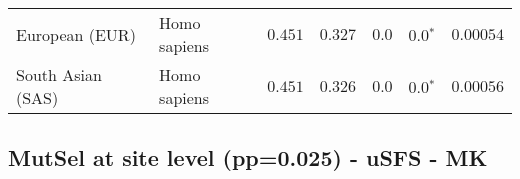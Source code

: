 \begin{center}
\begin{adjustbox}{width = 1\textwidth}
\begin{tabular}{|l|l|r|r|r|r|r|}
                 European (EUR) &         Homo sapiens &                                           $ 0.451$ &                                           $ 0.327$ &            $0.0$ &                  $\bm{0.0{^*}}$ &          $0.00054$ \\
              South Asian (SAS) &         Homo sapiens &                                           $ 0.451$ &                                           $ 0.326$ &            $0.0$ &                  $\bm{0.0{^*}}$ &          $0.00056$ \\
\bottomrule
\end{tabular}
\end{adjustbox}
\newpage
\end{center}
\subsection{MutSel at site level (pp=0.025) - uSFS - MK} 
